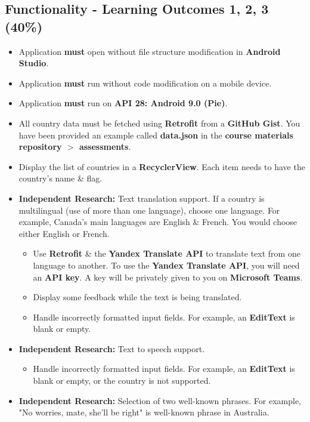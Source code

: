 \documentclass{article}
\begin{document}
\subsection*{Functionality - Learning Outcomes 1, 2, 3 (40\%)}
\begin{itemize}
	\item Application \textbf{must} open without file structure modification in \textbf{Android Studio}.
	\item Application \textbf{must} run without code modification on a mobile device.
	\item Application \textbf{must} run on \textbf{API 28: Android 9.0 (Pie)}.
	\item All country data must be fetched using \textbf{Retrofit} from a \textbf{GitHub Gist}. You have been provided an example called \textbf{data.json} in the \textbf{course materials repository $>$ assessments}.
	\item Display the list of countries in a \textbf{RecyclerView}. Each item needs to have the country's name \& flag.
	\item \textbf{Independent Research:} Text translation support. If a country is multilingual (use of more than one language), choose one language. For example, Canada's main languages are English \& French. You would choose either English or French.
	      \begin{itemize}
		      \item Use \textbf{Retrofit} \& the \textbf{Yandex Translate API} to translate text from one language to another. To use the \textbf{Yandex Translate API}, you will need an \textbf{API key}. A key will be privately given to you on \textbf{Microsoft Teams}.
		      \item Display some feedback while the text is being translated.
		      \item Handle incorrectly formatted input fields. For example, an \textbf{EditText} is blank or empty.
	      \end{itemize}
	\item \textbf{Independent Research:} Text to speech support.
	      \begin{itemize}
		      \item Handle incorrectly formatted input fields. For example, an \textbf{EditText} is blank or empty, or the country is not supported.
	      \end{itemize}
	\item \textbf{Independent Research:} Selection of two well-known phrases. For example, "No worries, mate, she'll be right" is well-known phrase in Australia.

\end{itemize}
\end{document}
